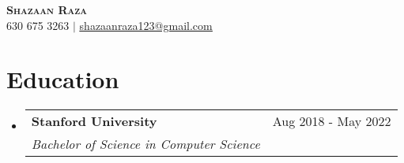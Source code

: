 \documentclass[11pt,a4paper]{article}
\makeatletter
\newcommand{\resumeSubheading}[4]{
  \vspace{-2pt}\item
    \begin{tabular*}{0.97\textwidth}[t]{l@{\extracolsep{\fill}}r}
      \textbf{#1} & #2 \\
      \textit{\small#3} & \textit{\small #4} \\
    \end{tabular*}\vspace{-7pt}
}
\newcommand{\resumeSubHeadingListStart}{\begin{itemize}[leftmargin=0.15in, label={}]}
\newcommand{\resumeSubHeadingListEnd}{\end{itemize}}
\makeatother
\begin{document}
\begin{center}
    \textbf{\Huge \scshape Shazaan Raza} \\ \vspace{1pt}
    \small 630 675 3263 $|$ \href{mailto:shazaanraza123@gmail.com}{\underline{shazaanraza123@gmail.com}}
    
\end{center}

\section{Education}
  \resumeSubHeadingListStart
    \resumeSubheading{Stanford University}{Aug 2018 - May 2022}{Bachelor of Science in Computer Science}{}
  \resumeSubHeadingListEnd

\end{document}
